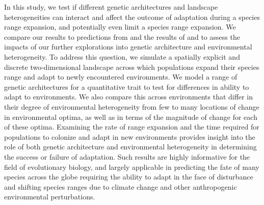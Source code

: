 In this study, we test if different genetic architectures and landscape heterogeneities can interact and affect the outcome of adaptation during a species range expansion, and potentially even limit a species range expansion. We compare our results to predictions from \citet{Barton:2001} and the results of \citet{Bridle:2010} and \citet{Schiffers:2014} to assess the impacts of our further explorations into genetic architecture and environmental heterogeneity. 
To address this question, we simulate a spatially explicit and discrete two-dimensional landscape across which populations expand their species range and adapt to newly encountered environments. We model a range of genetic architectures for a quantitative trait to test for differences in ability to adapt to environments. We also compare this across environments that differ in their degree of environmental heterogeneity from few to many locations of change in environmental optima, as well as in terms of the magnitude of change for each of these optima. Examining the rate of range expansion and the time required for populations to colonize and adapt in new environments provides insight into the role of both genetic architecture and environmental heterogeneity in determining the success or failure of adaptation. Such results are highly informative for the field of evolutionary biology, and largely applicable in predicting the fate of many species across the globe requiring the ability to adapt in the face of disturbance and shifting species ranges due to climate change and other anthropogenic environmental perturbations.




